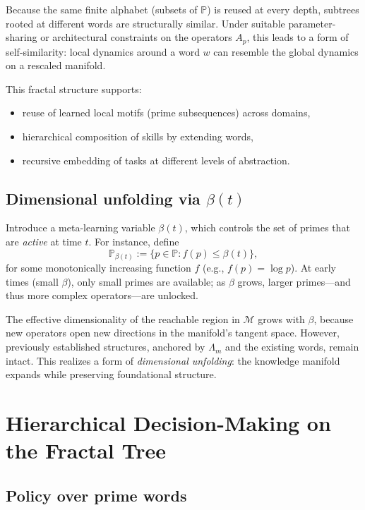 \documentclass[11pt]{article}
\newcommand{\Mcal}{\mathcal{M}}
\newcommand{\Lm}{\Lambda_m}
\begin{document}
Because the same finite alphabet (subsets of \(\mathbb{P}\)) is reused at every depth, subtrees rooted at different words are structurally similar.
Under suitable parameter-sharing or architectural constraints on the operators \(A_p\), this leads to a form of self-similarity: local dynamics around a word \(w\) can resemble the global dynamics on a rescaled manifold.

This fractal structure supports:
\begin{itemize}[nosep]
    \item reuse of learned local motifs (prime subsequences) across domains,
    \item hierarchical composition of skills by extending words,
    \item recursive embedding of tasks at different levels of abstraction.
\end{itemize}

\subsection{Dimensional unfolding via \texorpdfstring{\(\beta(t)\)}{beta(t)}}

Introduce a meta-learning variable \(\beta(t)\), which controls the set of primes that are \emph{active} at time \(t\).
For instance, define
\[
\mathbb{P}_{\beta(t)} := \{p \in \mathbb{P} : f(p) \leq \beta(t)\},
\]
for some monotonically increasing function \(f\) (e.g., \(f(p) = \log p\)).
At early times (small \(\beta\)), only small primes are available; as \(\beta\) grows, larger primes---and thus more complex operators---are unlocked.

The effective dimensionality of the reachable region in \(\Mcal\) grows with \(\beta\), because new operators open new directions in the manifold's tangent space.
However, previously established structures, anchored by \(\Lm\) and the existing words, remain intact.
This realizes a form of \emph{dimensional unfolding}: the knowledge manifold expands while preserving foundational structure.

\section{Hierarchical Decision-Making on the Fractal Tree}

\subsection{Policy over prime words}
\end{document}
